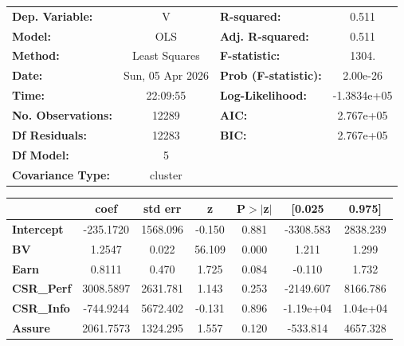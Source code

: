 \begin{center}
\begin{tabular}{lclc}
\toprule
\textbf{Dep. Variable:}    &        V         & \textbf{  R-squared:         } &       0.511     \\
\textbf{Model:}            &       OLS        & \textbf{  Adj. R-squared:    } &       0.511     \\
\textbf{Method:}           &  Least Squares   & \textbf{  F-statistic:       } &       1304.     \\
\textbf{Date:}             & Sun, 05 Apr 2026 & \textbf{  Prob (F-statistic):} &    2.00e-26     \\
\textbf{Time:}             &     22:09:55     & \textbf{  Log-Likelihood:    } &  -1.3834e+05    \\
\textbf{No. Observations:} &       12289      & \textbf{  AIC:               } &   2.767e+05     \\
\textbf{Df Residuals:}     &       12283      & \textbf{  BIC:               } &   2.767e+05     \\
\textbf{Df Model:}         &           5      & \textbf{                     } &                 \\
\textbf{Covariance Type:}  &     cluster      & \textbf{                     } &                 \\
\bottomrule
\end{tabular}
\begin{tabular}{lcccccc}
                   & \textbf{coef} & \textbf{std err} & \textbf{z} & \textbf{P$> |$z$|$} & \textbf{[0.025} & \textbf{0.975]}  \\
\midrule
\textbf{Intercept} &    -235.1720  &     1568.096     &    -0.150  &         0.881        &    -3308.583    &     2838.239     \\
\textbf{BV}        &       1.2547  &        0.022     &    56.109  &         0.000        &        1.211    &        1.299     \\
\textbf{Earn}      &       0.8111  &        0.470     &     1.725  &         0.084        &       -0.110    &        1.732     \\
\textbf{CSR\_Perf} &    3008.5897  &     2631.781     &     1.143  &         0.253        &    -2149.607    &     8166.786     \\
\textbf{CSR\_Info} &    -744.9244  &     5672.402     &    -0.131  &         0.896        &    -1.19e+04    &     1.04e+04     \\
\textbf{Assure}    &    2061.7573  &     1324.295     &     1.557  &         0.120        &     -533.814    &     4657.328     \\

\end{tabular}
\end{center}
